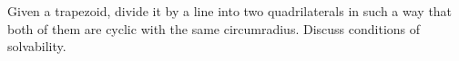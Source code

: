 Given a trapezoid, divide it by a line into two quadrilaterals in such a way that both of them are cyclic with the same circumradius. Discuss conditions of solvability.